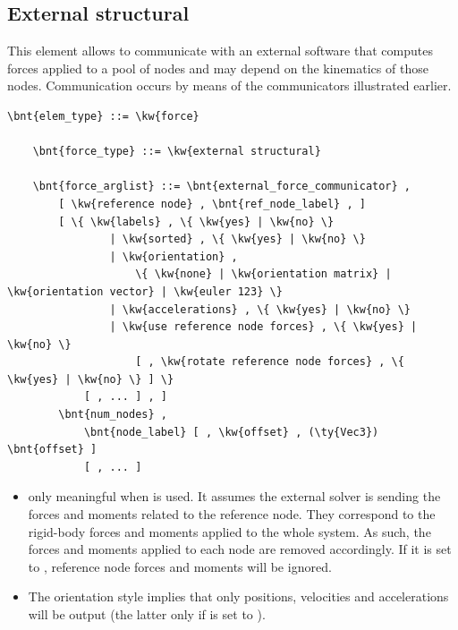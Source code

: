 \subsection{External structural}
\label{sec:EL:FORCE:EXTERNAL:STRUCTURAL}
This element allows to communicate with an external software that computes
forces applied to a pool of nodes and may depend on the kinematics of those
nodes.
Communication occurs by means of the communicators illustrated earlier.
\begin{Verbatim}[commandchars=\\\{\}]
    \bnt{elem_type} ::= \kw{force}

    \bnt{force_type} ::= \kw{external structural}

    \bnt{force_arglist} ::= \bnt{external_force_communicator} ,
        [ \kw{reference node} , \bnt{ref_node_label} , ]
        [ \{ \kw{labels} , \{ \kw{yes} | \kw{no} \}
                | \kw{sorted} , \{ \kw{yes} | \kw{no} \}
                | \kw{orientation} ,
                    \{ \kw{none} | \kw{orientation matrix} | \kw{orientation vector} | \kw{euler 123} \}
                | \kw{accelerations} , \{ \kw{yes} | \kw{no} \}
                | \kw{use reference node forces} , \{ \kw{yes} | \kw{no} \}
                    [ , \kw{rotate reference node forces} , \{ \kw{yes} | \kw{no} \} ] \}
            [ , ... ] , ]
        \bnt{num_nodes} ,
            \bnt{node_label} [ , \kw{offset} , (\ty{Vec3}) \bnt{offset} ]
            [ , ... ]
\end{Verbatim}
\begin{itemize}
\item {} only meaningful
when  is used.
It assumes the external solver is sending the forces and moments
related to the reference node.
They correspond to the rigid-body forces and moments applied
to the whole system.
As such, the forces and moments applied to each node
are removed accordingly.
If it is set to , reference node forces and moments
will be ignored.

\item The orientation style  implies that only positions, velocities 
and accelerations will be output (the latter only if 
is set to ).
\end{itemize}


